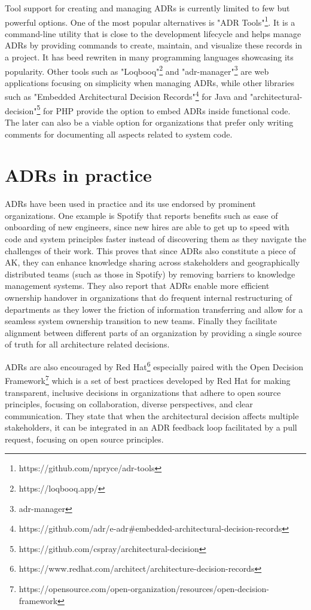         Tool support for creating and managing ADRs is currently limited to few but powerful options. One of the most popular alternatives is "ADR Tools"\footnote{https://github.com/npryce/adr-tools}. It is a command-line utility that is close to the development lifecycle and helps manage ADRs by providing commands to create, maintain, and visualize these records in a project. It has beed rewriten in many programming languages showcasing its popularity. Other tools such as "Loqbooq"\footnote{https://loqbooq.app/} and "adr-manager"\footnote{adr-manager} are web applications focusing on simplicity when managing ADRs, while other libraries such as "Embedded Architectural Decision Records"\footnote{https://github.com/adr/e-adr\#embedded-architectural-decision-records} for Java and "architectural-decision"\footnote{https://github.com/cspray/architectural-decision} for PHP provide the option to embed ADRs inside functional code. The later can also be a viable option for organizations that prefer only writing comments for documenting all aspects related to system code.

    \newpage
    \section{ADRs in practice}
        ADRs have been used in practice and its use endorsed by prominent organizations. One example is Spotify\cite{Spotify_ADRS} that reports benefits such as ease of onboarding of new engineers, since new hires are able to get up to speed with code and system principles faster instead of discovering them as they navigate the challenges of their work. This proves that since ADRs also constitute a piece of AK, they can enhance knowledge sharing across stakeholders and geographically distributed teams (such as those in Spotify) \cite{AK_management} by removing barriers to knowledge management systems. They also report that ADRs enable more efficient ownership handover in organizations that do frequent internal restructuring of departments as they lower the friction of information transferring and allow for a seamless system ownership transition to new teams. Finally they facilitate alignment between different parts of an organization by providing a single source of truth for all architecture related decisions.

        ADRs are also encouraged by Red Hat\footnote{https://www.redhat.com/architect/architecture-decision-records} especially paired with the Open Decision Framework\footnote{https://opensource.com/open-organization/resources/open-decision-framework} which is a set of best practices developed by Red Hat for making transparent, inclusive decisions in organizations that adhere to open source principles, focusing on collaboration, diverse perspectives, and clear communication. They state that when the architectural decision affects multiple stakeholders, it can be integrated in an ADR feedback loop facilitated by a pull request, focusing on open source principles.  

